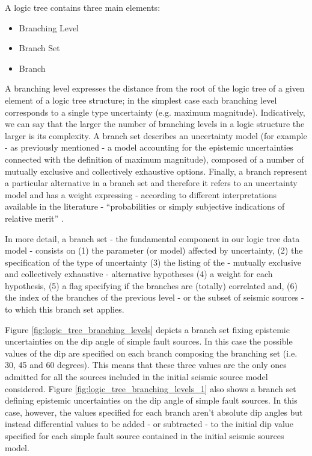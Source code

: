 %
A logic tree cont\-ains three main elements:
\begin{itemize}
\item Branching Level
\item Branch Set
\item Branch
\end{itemize}
%
A branching level expresses the distance from the root of the logic tree of a 
given element of a logic tree structure; in the simplest case each branching 
level corresponds to a single type uncertainty
(e.g. maximum magnitude). 
Indicatively, we can say that the larger the number of branching levels in a 
logic structure the larger is its complexity.
%
A branch set describes an uncertainty model (for example - as previously 
mentioned - a model accounting for the epistemic uncertainties connected with 
the definition of maximum magnitude), composed of a number of mutually 
exclusive and collectively exhaustive options. 
%
Finally, a branch represent a particular alternative in a branch set and 
therefore it refers to an uncertainty model and has a weight expressing - 
according to different interpretations available in the literature 
- ``probabilities or simply subjective indications of relative merit'' 
\citep[][page 999]{bommer2008}.

%
In more detail, a branch set - the fundamental component in our logic tree data 
model - consists on (1) the parameter (or model) affected 
by uncertainty, (2) the specification of the type of uncertainty (3) the 
listing of the - mutually exclusive and collectively exhaustive 
\citep{bommer2008} - alternative hypotheses (4) a weight for each hypothesis, 
(5) a flag specifying if the branches are (totally) correlated and, (6) the 
index of the branches of the previous level - or the subset of seismic 
sources - to which this branch set applies.

Figure \ref{fig:logic_tree_branching_levels} depicts a branch 
set fixing epistemic uncertainties on the dip angle of simple 
fault sources. In this case the possible values of the dip are specified
on each branch composing the branching set (i.e. 30, 45 and 60 degrees). This 
means that these three values are the only ones admitted for all the sources 
included in the initial seismic source model considered. 
%
Figure \ref{fig:logic_tree_branching_levels_1} also shows a branch
set defining epistemic uncertainties on the dip angle 
of simple fault sources. In this case, however, the values specified for each 
branch aren't absolute dip angles but instead differential values to be added - 
or subtracted - to the initial dip value specified for each simple fault source 
contained in the initial seismic sources model.

